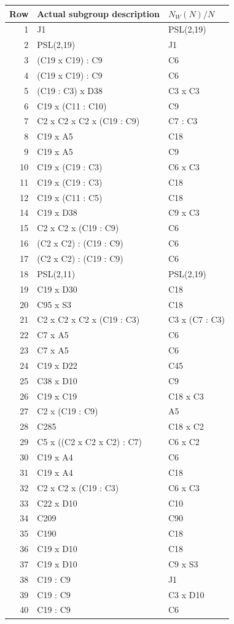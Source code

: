 \documentclass[10pt,a4paper]{article}
\begin{document}
\begin{longtable}{r p{77mm} p{53mm}}
\toprule Row&Actual subgroup description&$N_W(N)/N$\\\midrule\endhead
1&J1&PSL(2,19)\\
2&PSL(2,19)&J1\\
3&(C19 x C19) : C9&C6\\
4&(C19 x C19) : C9&C6\\
5&(C19 : C3) x D38&C3 x C3\\
6&C19 x (C11 : C10)&C9\\
7&C2 x C2 x C2 x (C19 : C9)&C7 : C3\\
8&C19 x A5&C18\\
9&C19 x A5&C9\\
10&C19 x (C19 : C3)&C6 x C3\\
11&C19 x (C19 : C3)&C18\\
12&C19 x (C11 : C5)&C18\\
14&C19 x D38&C9 x C3\\
15&C2 x C2 x (C19 : C9)&C6\\
16&(C2 x C2) : (C19 : C9)&C6\\
17&(C2 x C2) : (C19 : C9)&C6\\
18&PSL(2,11)&PSL(2,19)\\
19&C19 x D30&C18\\
20&C95 x S3&C18\\
21&C2 x C2 x C2 x (C19 : C3)&C3 x (C7 : C3)\\
22&C7 x A5&C6\\
23&C7 x A5&C6\\
24&C19 x D22&C45\\
25&C38 x D10&C9\\
26&C19 x C19&C18 x C3\\
27&C2 x (C19 : C9)&A5\\
28&C285&C18 x C2\\
29&C5 x ((C2 x C2 x C2) : C7)&C6 x C2\\
30&C19 x A4&C6\\
31&C19 x A4&C18\\
32&C2 x C2 x (C19 : C3)&C6 x C3\\
33&C22 x D10&C10\\
34&C209&C90\\
35&C190&C18\\
36&C19 x D10&C18\\
37&C19 x D10&C9 x S3\\
38&C19 : C9&J1\\
39&C19 : C9&C3 x D10\\
40&C19 : C9&C6\\

\end{longtable}
\end{document}
